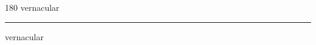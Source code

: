 
\begin{frame}
\begin{center}
\begin{turn}{180}
{\fontsize{2.5cm}{1em}\selectfont vernacular}
\end{turn}
\vspace{1em}\par  
\hrule
\vspace{1em}\par  
{\fontsize{2.5cm}{1em}\selectfont vernacular}
\end{center}
\end{frame}
